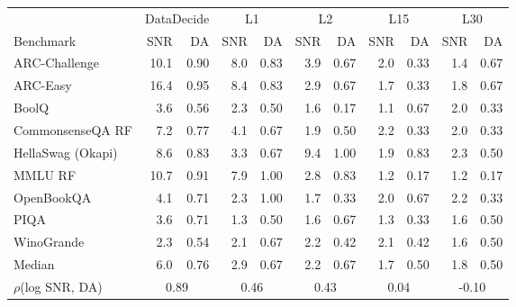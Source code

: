 \begin{tabular}{lrrrrrrrrrr}
\toprule
 & \multicolumn{2}{c}{DataDecide} & \multicolumn{2}{c}{L1} & \multicolumn{2}{c}{L2} & \multicolumn{2}{c}{L15} & \multicolumn{2}{c}{L30} \\
\cmidrule(lr){2-3}\cmidrule(lr){4-5}\cmidrule(lr){6-7}\cmidrule(lr){8-9}\cmidrule(lr){10-11}
Benchmark & SNR & DA & SNR & DA & SNR & DA & SNR & DA & SNR & DA \\
\midrule
ARC-Challenge & 10.1 & 0.90 & 8.0 & 0.83 & 3.9 & 0.67 & 2.0 & 0.33 & 1.4 & 0.67 \\
ARC-Easy & 16.4 & 0.95 & 8.4 & 0.83 & 2.9 & 0.67 & 1.7 & 0.33 & 1.8 & 0.67 \\
BoolQ & 3.6 & 0.56 & 2.3 & 0.50 & 1.6 & 0.17 & 1.1 & 0.67 & 2.0 & 0.33 \\
CommonsenseQA RF & 7.2 & 0.77 & 4.1 & 0.67 & 1.9 & 0.50 & 2.2 & 0.33 & 2.0 & 0.33 \\
HellaSwag (Okapi) & 8.6 & 0.83 & 3.3 & 0.67 & 9.4 & 1.00 & 1.9 & 0.83 & 2.3 & 0.50 \\
MMLU RF & 10.7 & 0.91 & 7.9 & 1.00 & 2.8 & 0.83 & 1.2 & 0.17 & 1.2 & 0.17 \\
OpenBookQA & 4.1 & 0.71 & 2.3 & 1.00 & 1.7 & 0.33 & 2.0 & 0.67 & 2.2 & 0.33 \\
PIQA & 3.6 & 0.71 & 1.3 & 0.50 & 1.6 & 0.67 & 1.3 & 0.33 & 1.6 & 0.50 \\
WinoGrande & 2.3 & 0.54 & 2.1 & 0.67 & 2.2 & 0.42 & 2.1 & 0.42 & 1.6 & 0.50 \\
\midrule
Median & 6.0 & 0.76 & 2.9 & 0.67 & 2.2 & 0.67 & 1.7 & 0.50 & 1.8 & 0.50 \\
$\rho$(log SNR, DA) & \multicolumn{2}{c}{0.89} & \multicolumn{2}{c}{0.46} & \multicolumn{2}{c}{0.43} & \multicolumn{2}{c}{0.04} & \multicolumn{2}{c}{-0.10} \\
\bottomrule
\end{tabular}
